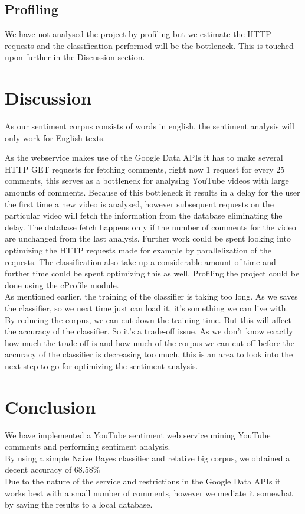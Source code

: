 \documentclass[conference]{IEEEtran}
\begin{document}
\subsection{Profiling}

We have not analysed the project by profiling but we estimate the HTTP requests and the classification performed will be the bottleneck. This is touched upon further in the Discussion section.

\section{Discussion}

As our sentiment corpus consists of words in english, the sentiment analysis will only work for English texts.

As the webservice makes use of the Google Data APIs it has to make several HTTP GET requests for fetching comments, right now 1 request for every 25 comments, this serves as a bottleneck for analysing YouTube videos with large amounts of comments. Because of this bottleneck it results in a delay for the user the first time a new video is analysed, however subsequent requests on the particular video will fetch the information from the database eliminating the delay. The database fetch happens only if the number of comments for the video are unchanged from the last analysis. Further work could be spent looking into optimizing the HTTP requests made for example by parallelization of the requests. The classification also take up a considerable amount of time and further time could be spent optimizing this as well. Profiling the project could be done using the cProfile module\cite{cprofile}.\\

As mentioned earlier, the training of the classifier is taking too long. As we saves the classifier, so we next time just can load it, it's something we can live with.  \\ 
By reducing the corpus, we can cut down the training time. But this will affect the accuracy of the classifier. So it's a trade-off issue. As we don't know exactly how much the trade-off is and how much of the corpus we can cut-off before the accuracy of the classifier is decreasing too much, this is an area to look into the next step to go for optimizing the sentiment analysis.

\section{Conclusion}
We have implemented a YouTube sentiment web service mining YouTube comments and performing sentiment analysis. \\
By using a simple Naive Bayes classifier and relative big corpus, we obtained a decent accuracy of 68.58\%\\
Due to the nature of the service and restrictions in the Google Data APIs it works best with a small number of comments, however we mediate it somewhat by saving the results to a local database.
\end{document}
